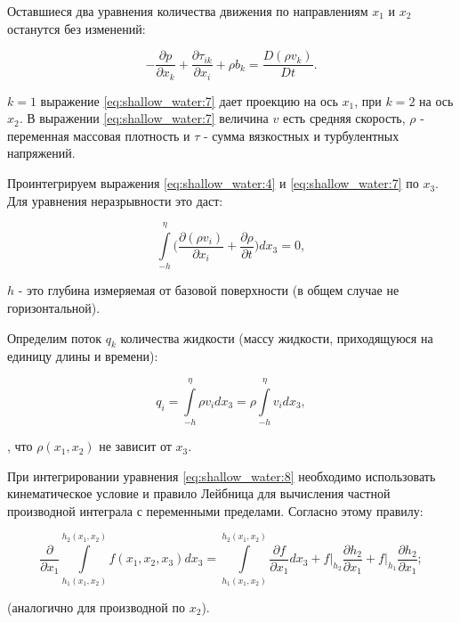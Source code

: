 \documentclass[14pt]{extreport}
\begin{document}
Оставшиеся два уравнения количества движения по направлениям $x_1$ и $x_2$ останутся без изменений:

\begin{equation}\label{eq:shallow_water:7}
-\frac{\partial p}{\partial x_k} + \frac{\partial \tau_{ik}}{\partial x_i} + \rho b_k = \frac{D(\rho v_k)}{Dt}.
\end{equation}

 $k=1$ выражение \ref{eq:shallow_water:7} дает проекцию на ось $x_1$, при $k=2$ на ось $x_2$. В выражении \ref{eq:shallow_water:7} величина $v$ есть средняя скорость, $\rho$ - переменная массовая плотность и $\tau$ - сумма вязкостных и турбулентных напряжений.

Проинтегрируем выражения \ref{eq:shallow_water:4} и \ref{eq:shallow_water:7} по $x_3$. Для уравнения неразрывности это даст:

\begin{equation}\label{eq:shallow_water:8}
\int\limits^\eta_{-h} \bigg(\frac{\partial (\rho v_i)}{\partial x_i} + \frac{\partial \rho}{\partial t}\bigg) dx_3 =0,
\end{equation}

 $h$ - это глубина измеряемая от базовой поверхности (в общем случае не горизонтальной).

Определим поток $q_k$ количества жидкости (массу жидкости, приходящуюся на единицу длины и времени):


\begin{equation}\label{eq:shallow_water:9}
q_i = \int\limits^\eta_{-h} \rho v_i dx_3 = \rho \int\limits^\eta_{-h} v_i dx_3,
\end{equation}

, что $\rho(x_1, x_2)$ не зависит от $x_3$.

При интегрировании уравнения \ref{eq:shallow_water:8} необходимо использовать кинематическое условие и правило Лейбница \cite{bib:calc:zorich} для вычисления частной производной интеграла с переменными пределами. Согласно этому правилу:


\begin{equation}\label{eq:shallow_water:10}
\frac{\partial}{\partial x_1} \int\limits^{h_2(x_1,x_2)}_{h_1(x_1,x_2)} f(x_1, x_2, x_3) dx_3=\int\limits^{h_2(x_1,x_2)}_{h_1(x_1,x_2)} \frac{\partial f}{\partial x_1} dx_3 + f \bigg|_{h_2}  \frac{\partial h_2}{\partial x_1} + f \bigg|_{h_1} \frac{\partial h_2}{\partial x_1};
\end{equation}

\noindent(аналогично для производной по $x_2$).
\end{document}
